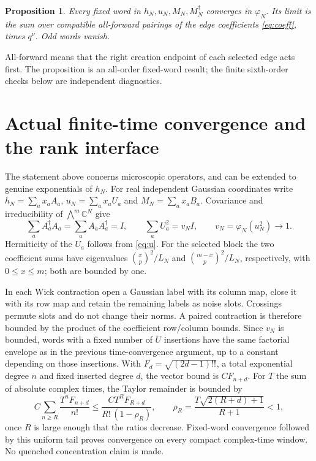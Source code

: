 \documentclass[11pt]{article}
\newtheorem{proposition}{Proposition}
\begin{document}
\begin{proposition}
Every fixed word in $h_N,u_N,M_N,M_N^\dagger$ converges in $\varphi_N$.
Its limit is the sum over compatible all-forward pairings of the edge
coefficients \eqref{eq:coeff}, times $q^\nu$. Odd words vanish.
\end{proposition}
All-forward means that the right creation endpoint of each selected
edge acts first. The proposition is an all-order fixed-word result;
the finite sixth-order checks below are independent diagnostics.

\newpage
\section{Actual finite-time convergence and the rank interface}
The statement above concerns microscopic operators, and can be extended
to genuine exponentials of $h_N$. For real independent Gaussian
coordinates write $h_N=\sum_a x_a A_a$, $u_N=\sum_a x_a U_a$ and
$M_N=\sum_a x_a B_a$. Covariance and irreducibility of
$\bigwedge^m\mathbb C^N$ give
\begin{equation}
 \sum_a A_a^\dagger A_a=\sum_a A_aA_a^\dagger=I,
 \qquad \sum_a U_a^2=v_N I,\qquad v_N=\varphi_N(u_N^2)\to1.
\end{equation}
Hermiticity of the $U_a$ follows from \eqref{eq:u}. For the selected
block the two coefficient sums have eigenvalues
$\binom xp^2/L_N$ and $\binom{m-x}p^2/L_N$, respectively, with
$0\le x\le m$; both are bounded by one.

In each Wick contraction open a Gaussian label with its column map,
close it with its row map and retain the remaining labels as noise
slots. Crossings permute slots and do not change their norms. A paired
contraction is therefore bounded by the product of the coefficient
row/column bounds. Since $v_N$ is bounded, words with a fixed number of
$U$ insertions have the same factorial envelope as in the previous
time-convergence argument, up to a constant depending on those
insertions. With $F_d=\sqrt{(2d-1)!!}$, a total exponential degree $n$
and fixed inserted degree $d$, the vector bound is $C F_{n+d}$.
For $T$ the sum of absolute complex times, the Taylor remainder is
bounded by
\begin{equation}
 C\sum_{n\ge R}\frac{T^n F_{n+d}}{n!}
 \le \frac{C T^R F_{R+d}}{R!\,(1-\rho_R)},
 \qquad \rho_R=\frac{T\sqrt{2(R+d)+1}}{R+1}<1,
\end{equation}
once $R$ is large enough that the ratios decrease. Fixed-word
convergence followed by this uniform tail proves convergence on every
compact complex-time window. No quenched concentration claim is made.
\end{document}
